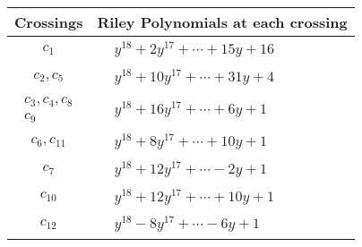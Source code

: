 \documentclass[1p]{elsarticle_modified}
\theoremstyle{definition}
\begin{document}
\begin{tabular}{m{50pt}|m{274pt}}
Crossings & \hspace{64pt}Riley Polynomials at each crossing \\
\hline $$\begin{aligned}c_{1}\end{aligned}$$&$\begin{aligned}
&y^{18}+2 y^{17}+\cdots+15 y+16
\end{aligned}$\\
\hline $$\begin{aligned}c_{2},c_{5}\end{aligned}$$&$\begin{aligned}
&y^{18}+10 y^{17}+\cdots+31 y+4
\end{aligned}$\\
\hline $$\begin{aligned}c_{3},c_{4},c_{8}\\c_{9}\end{aligned}$$&$\begin{aligned}
&y^{18}+16 y^{17}+\cdots+6 y+1
\end{aligned}$\\
\hline $$\begin{aligned}c_{6},c_{11}\end{aligned}$$&$\begin{aligned}
&y^{18}+8 y^{17}+\cdots+10 y+1
\end{aligned}$\\
\hline $$\begin{aligned}c_{7}\end{aligned}$$&$\begin{aligned}
&y^{18}+12 y^{17}+\cdots-2 y+1
\end{aligned}$\\
\hline $$\begin{aligned}c_{10}\end{aligned}$$&$\begin{aligned}
&y^{18}+12 y^{17}+\cdots+10 y+1
\end{aligned}$\\
\hline $$\begin{aligned}c_{12}\end{aligned}$$&$\begin{aligned}
&y^{18}-8 y^{17}+\cdots-6 y+1
\end{aligned}$\\
\hline
\end{tabular}\\~\\
\end{document}
